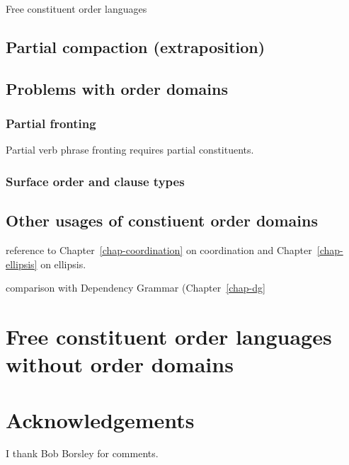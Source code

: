 \documentclass[output=paper]{langsci/langscibook}
\begin{document}
Free constituent order languages \citet{DS99a}

\subsection{Partial compaction (extraposition)}

\subsection{Problems with order domains}

\subsubsection{Partial fronting}

Partial verb phrase fronting requires partial constituents.

\citep{Kathol2001a,MuellerGS}

\subsubsection{Surface order and clause types}


\subsection{Other usages of constiuent order domains}

reference to Chapter~\ref{chap-coordination} on coordination and Chapter~\ref{chap-ellipsis} on ellipsis.

comparison with Dependency Grammar (Chapter~\ref{chap-dg}

\section{Free constituent order languages without order domains}

\citet{Bender2008a}


 
\section*{Acknowledgements}

I thank Bob Borsley for comments.

{\sloppy
\printbibliography[heading=subbibliography,notkeyword=this] 
}
\end{document}
